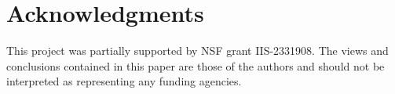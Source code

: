 \documentclass{article}
\theoremstyle{plain}
\begin{document}






\section*{Acknowledgments}
This project was partially supported by NSF grant IIS-2331908. The views and conclusions contained in this paper are those of the authors and should not be interpreted as representing any funding agencies.






\appendix
\onecolumn



\end{document}
